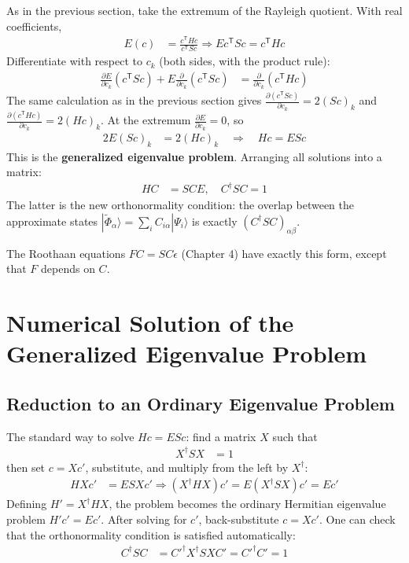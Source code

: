 As in the previous section, take the extremum of the Rayleigh quotient. With real coefficients,
\begin{align*}
E(c) &= \frac{c^{\mathsf T} H c}{c^{\mathsf T} S c} \Rightarrow E c^{\mathsf T} S c = c^{\mathsf T} H c
\end{align*}
Differentiate with respect to $c_k$ (both sides, with the product rule):
\begin{align*}
\frac{\partial E}{\partial c_k} (c^{\mathsf T} S c) + E \frac{\partial}{\partial c_k}(c^{\mathsf T} S c) &= \frac{\partial}{\partial c_k}(c^{\mathsf T} H c)
\end{align*}
The same calculation as in the previous section gives $\frac{\partial (c^{\mathsf T} S c)}{\partial c_k} = 2 (S c)_k$ and $\frac{\partial (c^{\mathsf T} H c)}{\partial c_k} = 2 (H c)_k$. At the extremum $\frac{\partial E}{\partial c_k} = 0$, so
\begin{align}\label{eq:HcESc}
2 E (S c)_k &= 2 (H c)_k \quad\Rightarrow\quad H c = E S c
\end{align}
This is the \textbf{generalized eigenvalue problem}. Arranging all solutions into a matrix:
\begin{align*}
H C &= S C E, \quad C^\dagger S C = 1
\end{align*}
The latter is the new orthonormality condition: the overlap between the approximate states $|\tilde{\Phi}_\alpha\rangle = \sum_i C_{i \alpha} |\Psi_i\rangle$ is exactly $(C^\dagger S C)_{\alpha \beta}$.

The Roothaan equations $F C = S C \epsilon$ (Chapter 4) have exactly this form, except that $F$ depends on $C$.

\section{Numerical Solution of the Generalized Eigenvalue Problem}

\subsection{Reduction to an Ordinary Eigenvalue Problem}

The standard way to solve $H c = E S c$: find a matrix $X$ such that
\begin{align}\label{eq:XSX}
X^\dagger S X &= 1
\end{align}
then set $c = X c'$, substitute, and multiply from the left by $X^\dagger$:
\begin{align*}
H X c' & = E S X c' \Rightarrow (X^\dagger H X) c' = E (X^\dagger S X) c' = E c'
\end{align*}
Defining $H' = X^\dagger H X$, the problem becomes the ordinary Hermitian eigenvalue problem $H' c' = E c'$. After solving for $c'$, back-substitute $c = X c'$. One can check that the orthonormality condition is satisfied automatically:
\begin{align*}
C^\dagger S C &= C'^\dagger X^\dagger S X C' = C'^\dagger C' = 1
\end{align*}

